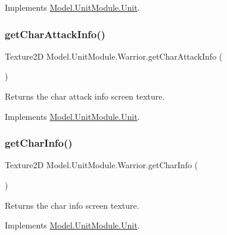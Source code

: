 Implements \hyperlink{interface_model_1_1_unit_module_1_1_unit_a6e9528d09bca7702fe99cc95135ede36}{Model.\+Unit\+Module.\+Unit}.

\hypertarget{class_model_1_1_unit_module_1_1_warrior_a6774680a84b9fea3ac5e95f0fc8ad9a7}{}\label{class_model_1_1_unit_module_1_1_warrior_a6774680a84b9fea3ac5e95f0fc8ad9a7} 
\subsubsection{\texorpdfstring{get\+Char\+Attack\+Info()}{getCharAttackInfo()}}
{\footnotesize\ttfamily Texture2D Model.\+Unit\+Module.\+Warrior.\+get\+Char\+Attack\+Info (\begin{DoxyParamCaption}{ }\end{DoxyParamCaption})\hspace{0.3cm}{\ttfamily [inline]}}

Returns the char attack info screen texture. 

Implements \hyperlink{interface_model_1_1_unit_module_1_1_unit_a7c89d9a1dc648b556b7e57cdcdbf2930}{Model.\+Unit\+Module.\+Unit}.

\hypertarget{class_model_1_1_unit_module_1_1_warrior_a4b5e10506a23aff7acb02896e4762da7}{}\label{class_model_1_1_unit_module_1_1_warrior_a4b5e10506a23aff7acb02896e4762da7} 
\subsubsection{\texorpdfstring{get\+Char\+Info()}{getCharInfo()}}
{\footnotesize\ttfamily Texture2D Model.\+Unit\+Module.\+Warrior.\+get\+Char\+Info (\begin{DoxyParamCaption}{ }\end{DoxyParamCaption})\hspace{0.3cm}{\ttfamily [inline]}}

Returns the char info screen texture. 

Implements \hyperlink{interface_model_1_1_unit_module_1_1_unit_a4e2aeae552d85c8938e609729bcd1a44}{Model.\+Unit\+Module.\+Unit}.

